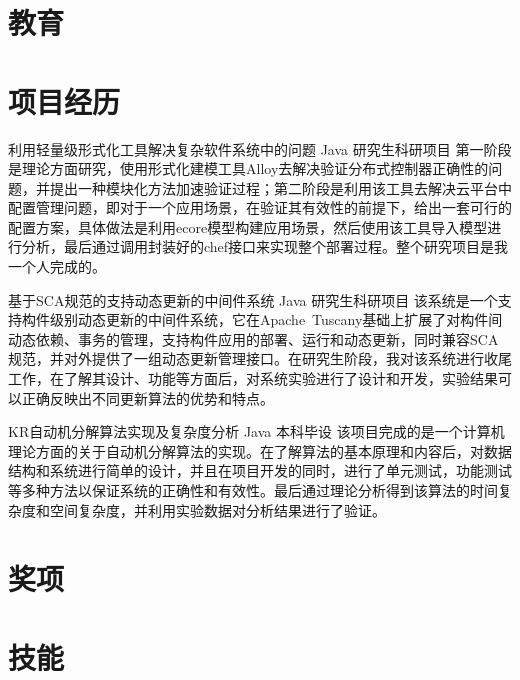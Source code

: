 \documentclass[11pt,a4paper]{moderncv}
\title{}               %
\begin{document}
\maketitle

\section{教育}

\section{项目经历}
\renewcommand{\baselinestretch}{1.2}

{利用轻量级形式化工具解决复杂软件系统中的问题}
{Java}
{研究生科研项目}{}
{第一阶段是理论方面研究，使用形式化建模工具Alloy去解决验证分布式控制器正确性的问题，并提出一种模块化方法加速验证过程；第二阶段是利用该工具去解决云平台中配置管理问题，即对于一个应用场景，在验证其有效性的前提下，给出一套可行的配置方案，具体做法是利用ecore模型构建应用场景，然后使用该工具导入模型进行分析，最后通过调用封装好的chef接口来实现整个部署过程。整个研究项目是我一个人完成的。}

\vspace*{0.2\baselineskip}
{基于SCA规范的支持动态更新的中间件系统}
{Java}
{研究生科研项目}{}
{该系统是一个支持构件级别动态更新的中间件系统，它在Apache~Tuscany基础上扩展了对构件间动态依赖、事务的管理，支持构件应用的部署、运行和动态更新，同时兼容SCA规范，并对外提供了一组动态更新管理接口。在研究生阶段，我对该系统进行收尾工作，在了解其设计、功能等方面后，对系统实验进行了设计和开发，实验结果可以正确反映出不同更新算法的优势和特点。}

\vspace*{0.2\baselineskip}
{KR自动机分解算法实现及复杂度分析}
{Java}
{本科毕设}{}
{该项目完成的是一个计算机理论方面的关于自动机分解算法的实现。在了解算法的基本原理和内容后，对数据结构和系统进行简单的设计，并且在项目开发的同时，进行了单元测试，功能测试等多种方法以保证系统的正确性和有效性。最后通过理论分析得到该算法的时间复杂度和空间复杂度，并利用实验数据对分析结果进行了验证。}

\vspace*{0.2\baselineskip}

\section{奖项}

\section{技能}


\closesection{}                   %
\renewcommand{\listitemsymbol}{-} %
\end{document}
